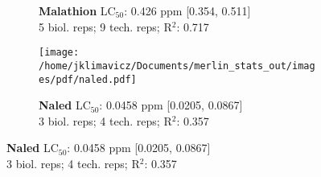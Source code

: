 \documentclass{article}
\begin{document}
\begin{figure}[thp!]
\begin{subfigure}{0.500\textwidth}
      \caption*{\textbf{Malathion} LC$_{50}$: 0.426 ppm [0.354, 0.511] \\ 
5 biol. reps; 9 tech. reps; R$^2$: 0.717}
      \vspace{0.1cm}
   \end{subfigure}%
   \begin{subfigure}{0.500\textwidth}
      \centering
      \texttt{[image: /home/jklimavicz/Documents/merlin\_stats\_out/images/pdf/naled.pdf]}
      \vspace{-0.05cm}
      \caption*{\textbf{Naled} LC$_{50}$: 0.0458 ppm [0.0205, 0.0867] \\ 
3 biol. reps; 4 tech. reps; R$^2$: 0.357}
      \vspace{0.1cm}
   \end{subfigure}%
\end{figure}
\clearpage
\pagebreak
\vspace{-0.1cm}
\end{document}
